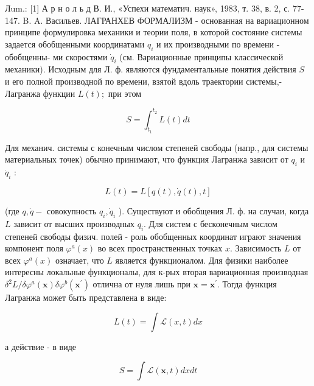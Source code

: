 \documentclass[10pt]{article}
\begin{document}
Лum.: [1] А р н о л ь д В. И., «Успехи математич. наук», 1983, т. 38, в. 2, с. 77-147. B. A. Васильев. ЛАГРАНХЕВ ФОРМАЛИЗМ - основанная на вариационном принципе формулировка механики и теории поля, в которой состояние системы задается обобщенными координатами $q_{i}$ и их производными по времени - обобщенны- ми скоростями $\dot{q}_{i}$ (см. Вариационные принципы классической механики). Исходным для Л. ф. являются фундаментальные понятия действия $S$ и его полной производной по времени, взятой вдоль траектории системы,- Лагранжа функции $L(t) ;$ при этом



\[

S=\int_{t_{1}}^{t_{2}} L(t) d t

\]



Для механич. системы с конечным числом степеней свободы (напр., для системы материальных точек) обычно принимают, что функция Лагранжа зависит от $q_{i}$ и $\dot{q}_{i}$ :



\[

L(t)=L[q(t), \dot{q}(t), t]

\]



(где $q, \dot{q}-$ совокупность $q_{i}, \dot{q}_{i}$ ). Существуют и обобщения Л. ф. на случаи, когда $L$ зависит от высших производных $q_{i}$. Для систем с бесконечным числом степеней свободы физич. полей - роль обобщенных координат играют значения компонент поля $\varphi^{a}(x)$ во всех пространственных точках $x$. Зависимость $L$ от всех $\varphi^{a}(x)$ означает, что $L$ является функционалом. Для физики наиболее интересны локальные функционалы, для к-рых вторая вариационная производная $\delta^{2} L / \delta \varphi^{a}(\boldsymbol{x}) \delta \varphi^{b}\left(\boldsymbol{x}^{\prime}\right)$ отлична от нуля лишь при $\boldsymbol{x}=\boldsymbol{x}^{\prime}$. Тогда функция Лагранжа может быть представлена в виде:



\[

L(t)=\int \mathscr{L}(x, t) d x

\]



а действие - в виде



\[

S=\int \mathscr{L}(\boldsymbol{x}, t) d x d t

\]
\end{document}
